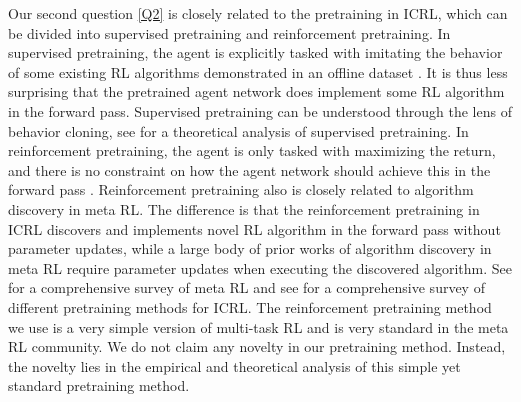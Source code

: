 \documentclass{article}
\begin{document}
Our second question \ref{Q2} is closely related to the pretraining in ICRL,
which can be divided into supervised pretraining and reinforcement pretraining.
In supervised pretraining,
the agent is explicitly tasked with imitating the behavior of some existing RL algorithms demonstrated in an offline dataset \citep{xu2022prompting,laskin2022context,raparthy2023generalization,sinii2023context,zisman2023emergence,shi2024cross,dai2024context,huang2024context,huang2024decision,kirsch2023towards,wang2024hierarchical,lee2024supervised}.
It is thus less surprising \citep{krishnamurthy2024can} that the pretrained agent network does implement some RL algorithm in the forward pass.
Supervised pretraining can be understood through the lens of behavior cloning,
see \citet{lin2023transformers} for a theoretical analysis of supervised pretraining.
In reinforcement pretraining,
the agent is only tasked with maximizing the return, and there is no constraint on how the agent network should achieve this in the forward pass \citep{duan2016rl,wang2016learning,kirsch2022symmetry,bauer2023human,grigsby2023amago,lus42023,park2024llm,xu2024meta,grigsby2024amago,cook2024artificial}.
Reinforcement pretraining also is closely related to algorithm discovery in meta RL.
The difference is that the reinforcement pretraining in ICRL discovers and implements novel RL algorithm in the forward pass without parameter updates,
while a large body of prior works of algorithm discovery in meta RL \citep{kirsch2019improving,oh2020discovering,lu2022discovered} require parameter updates when executing the discovered algorithm. 
See \citet{beck2023survey} for a comprehensive survey of meta RL
and see \citet{moeini2025survey} for a comprehensive survey of different pretraining methods for ICRL.
The reinforcement pretraining method we use is a very simple version of multi-task RL and is very standard in the meta RL community.
We do not claim any novelty in our pretraining method.
Instead,
the novelty lies in the empirical and theoretical analysis of this simple yet standard pretraining method.

\end{document}
